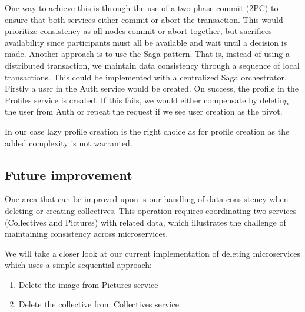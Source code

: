 One way to achieve this is through the use of a two-phase commit (2PC)
to ensure that both services either commit or abort the transaction.
This would prioritize consistency as all nodes commit or abort together,
but sacrifices availability since participants must all be available and 
wait until a decision is made.
Another approach is to use the Saga pattern.
That is, instead of using a distributed transaction, we maintain data consistency
through a sequence of local transactions.
This could be implemented with a centralized Saga orchestrator.
Firstly a user in the Auth service would be created. On success, the profile in the Profiles service is created. If this fails, we would either compensate 
by deleting the user from Auth or repeat the request if we see user creation as the pivot.

In our case lazy profile creation is the right choice as for profile creation as the added complexity is not warranted. 



\subsection{Future improvement}
One area that can be improved upon is our handling of data consistency
when deleting or creating collectives.
This operation requires coordinating two services (Collectives and Pictures)
with related data, which illustrates the challenge of maintaining consistency
across microservices.

We will take a closer look at our current implementation of deleting microservices which
uses a simple sequential approach:
\begin{enumerate}
    \item Delete the image from Pictures service
    \item Delete the collective from Collectives service
\end{enumerate}

